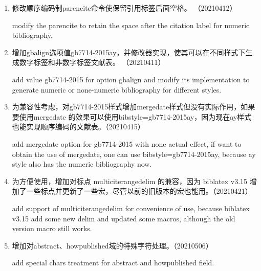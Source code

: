 \begin{enumerate}
\item 修改顺序编码制parencite命令使保留引用标签后面空格。 （20210412）

modify the parencite to retain the space after the citation label for numeric bibliography.


\item 增加gbalign选项值gb7714-2015ay，并修改器实现，使其可以在不同样式下生成数字标签和非数字标签文献表。 （20210411）

add value gb7714-2015 for option gbalign and modify its implementation to generate numeric or none-numeric bibliography for different styles.

\item 为兼容性考虑，对gb7714-2015样式增加mergedate样式但没有实际作用，如果要使用mergedate 的效果可以使用bibstyle=gb7714-2015ay，因为现在ay样式也能实现顺序编码的文献表。（20210415）

add mergedate option for gb7714-2015 with none actual effect, if want to obtain the use of mergedate, one can use bibstyle=gb7714-2015ay, because ay style also has the numeric bibliography now.

\item 为方便使用，增加对标点 multiciterangedelim 的兼容，因为 biblatex v3.15 增加了一些标点并更新了一些宏，尽管以前的旧版本的宏也能用。（20210421）

add support of multiciterangedelim for convenience of use, because biblatex v3.15 add some new delim and updated some macros, although the old version macro still works.

\item 增加对abstract、howpublished域的特殊字符处理。（20210506）

add special chars treatment for abstract and howpublished field.

\end{enumerate}

\label{up:20210403}

